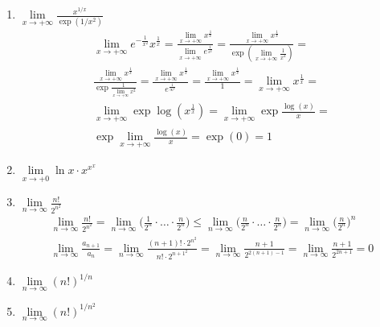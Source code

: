 		\subsection{}
		\begin{enumerate}
		\item $\lim \limits_{x \to + \infty} \frac{x^{1 / x}}{\exp \left(1 / x^{2}\right)}$\\		
			\begin{gather*}
				\lim \limits_{x \to + \infty} e^{ - \frac{1}{x^2}} x^{\frac{1}{x}} = 
				\frac{\lim \limits_{x \to + \infty} x^{\frac{1}{x}}}{\lim \limits_{x \to + \infty} e^{\frac{1}{x^2}}} = 
				\frac{\lim \limits_{x \to + \infty} x^{\frac{1}{x}}}{\exp (\lim \limits_{x \to + \infty} \frac{1}{x^2})} = \\
				\frac{\lim \limits_{x \to + \infty} x^{\frac{1}{x}}}{\exp \frac{1}{\lim \limits_{x \to + \infty} x^2}} = 
				\frac{\lim \limits_{x \to + \infty} x^{\frac{1}{x}}}{e^{\frac{1}{\infty^2}}} = 
				\frac{\lim \limits_{x \to + \infty} x^{\frac{1}{x}}}{1} = 
				\lim \limits_{x \to + \infty} x^{\frac{1}{x}} = \\
				\lim \limits_{x \to + \infty} \exp\log(x^{\frac{1}{x}}) = 
				\lim \limits_{x \to + \infty} \exp \frac{\log(x)}{x} = \\
				\exp \lim \limits_{x \to + \infty} \frac{\log(x)}{x} = 
				\exp (0) = 1			
			\end{gather*}
		
		\item $\lim \limits_{x \to + 0} \ln x \cdot x^{x^{x}}$
		
		\item $\lim \limits_{n \to \infty} \frac{n!}{2^{n^{2}}}$\\
			\begin{gather*}
				\lim \limits_{n \to \infty} \frac{n!}{2^{n^{2}}} = 
				\lim \limits_{n \to \infty} \bigg( \frac{1}{2^{n}} \cdot \ldots \cdot \frac{n}{2^{n}} \bigg) \leqslant
				\lim \limits_{n \to \infty} \bigg( \frac{n}{2^{n}} \cdot \ldots \cdot \frac{n}{2^{n}} \bigg) = 
				\lim \limits_{n \to \infty} \bigg( \frac{n}{2^{n}} \bigg)^{n}\\
				\lim \limits_{n \to \infty} \frac{a_{n + 1}}{a_{n}} = 
				\lim \limits_{n \to \infty} \frac{(n + 1)! \cdot 2^{n^2}}{n! \cdot 2^{{n + 1}^2}} = 
				\lim \limits_{n \to \infty} \frac{n + 1}{2^{2(n + 1) - 1}} = 
				\lim \limits_{n \to \infty} \frac{n + 1}{2^{2n + 1}} = 0
			\end{gather*}
		
		\item $\lim \limits_{n \to \infty}(n!)^{1 / n}$
		
		\item $\lim \limits_{n \to \infty}(n!)^{1 / n^{2}}$
		
		\end{enumerate}
		

